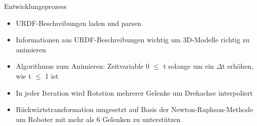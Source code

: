 \documentclass{beamer}
\begin{document}
\begin{frame}{Entwicklungsprozess}
  \begin{itemize}
    \setlength{\itemsep}{1em}
    \item URDF-Beschreibungen laden und parsen
    \item Informationen aus URDF-Beschreibungen wichtig um 3D-Modelle richtig zu animieren
    \item Algorithmus zum Animieren: Zeitvariable 0 $\le$ t solange um ein $\Delta$t erhöhen, wie t $\le$ 1 ist
    \item In jeder Iteration wird Rotation mehrerer Gelenke um Drehachse interpoliert
    \item Rückwärtstransformation umgesetzt auf Basis der Newton-Raphson-Methode um Roboter mit mehr als 6 Gelenken zu unterstützen
  \end{itemize}
\end{frame}





\end{document}

